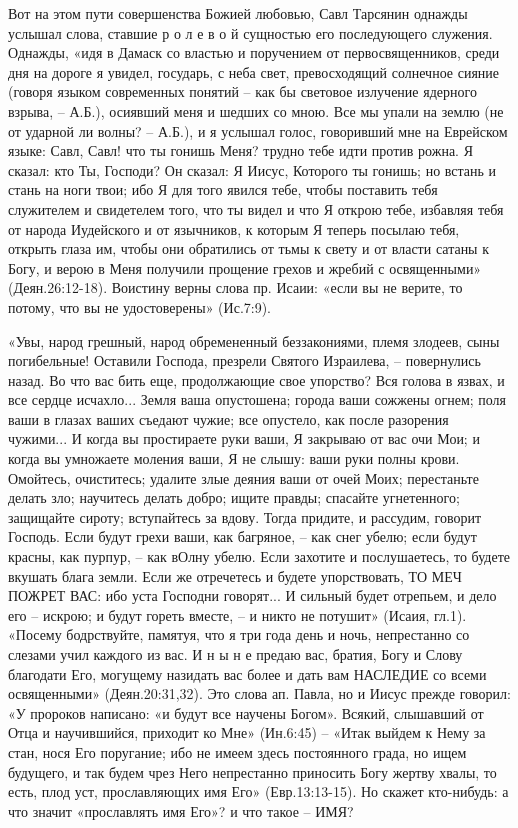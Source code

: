       Вот на этом пути совершенства Божией любовью, Савл Тарсянин однажды услышал слова, ставшие  р о л е в о й  сущностью его последующего служения. Однажды, «идя в Дамаск со властью и поручением от первосвященников, среди дня на дороге я увидел, государь, с неба свет, превосходящий солнечное сияние (говоря языком современных понятий – как бы световое излучение ядерного взрыва, – А.Б.), осиявший меня и шедших со мною. Все мы упали на землю (не от ударной ли волны? – А.Б.), и я услышал голос, говоривший мне на Еврейском языке: Савл, Савл! что ты гонишь Меня?  трудно тебе идти против рожна.  Я сказал: кто Ты, Господи?  Он сказал: Я Иисус, Которого ты гонишь; но встань и стань на ноги твои; ибо Я для того явился тебе, чтобы поставить тебя служителем и свидетелем того, что ты видел и что Я открою тебе, избавляя тебя от народа Иудейского и от язычников, к которым Я теперь посылаю тебя,  открыть глаза им, чтобы они обратились от тьмы к свету и от власти сатаны к Богу, и верою в Меня получили прощение грехов и жребий с освященными» (Деян.26:12-18).
     Воистину верны слова пр. Исаии: «если вы не верите, то потому, что вы не удостоверены» (Ис.7:9).

      «Увы, народ грешный, народ обремененный беззакониями, племя злодеев, сыны погибельные!
Оставили Господа, презрели Святого Израилева, – повернулись назад. Во что вас бить еще, продолжающие свое упорство? Вся голова в язвах, и все сердце исчахло... Земля ваша опустошена; города ваши сожжены огнем; поля ваши в глазах ваших съедают чужие; все опустело, как после разорения чужими...  И когда вы простираете руки ваши, Я закрываю от вас очи Мои; и когда вы умножаете моления ваши, Я не слышу: ваши руки полны крови.
     Омойтесь, очиститесь; удалите злые деяния ваши от очей Моих; перестаньте делать зло; научитесь делать добро; ищите правды; спасайте угнетенного; защищайте сироту; вступайтесь за вдову.
     Тогда придите, и рассудим, говорит Господь. Если будут грехи ваши, как багряное, – как снег убелю;  если будут красны, как пурпур, – как вОлну убелю.      Если захотите и послушаетесь, то будете вкушать блага земли.    Если же отречетесь и будете упорствовать, ТО МЕЧ ПОЖРЕТ ВАС: ибо уста Господни говорят...  И сильный будет отрепьем, и дело его – искрою;  и будут гореть вместе, – и никто не потушит» (Исаия, гл.1).
«Посему бодрствуйте, памятуя, что я три года день и ночь, непрестанно со слезами учил каждого из вас. И  н ы н е   предаю вас, братия, Богу и Слову благодати Его, могущему назидать вас более и дать вам  НАСЛЕДИЕ  со всеми освященными» (Деян.20:31,32).    Это слова ап. Павла, но и Иисус прежде говорил: «У пророков написано: «и будут все научены Богом». Всякий, слышавший от Отца и научившийся, приходит ко Мне» (Ин.6:45) – «Итак выйдем к Нему за стан, нося Его поругание; ибо не имеем здесь постоянного града, но ищем будущего, и так будем чрез Него непрестанно приносить Богу жертву хвалы, то есть, плод уст, прославляющих имя Его» (Евр.13:13-15).
     Но скажет кто-нибудь: а что значит «прославлять имя Его»? и что такое – ИМЯ?

